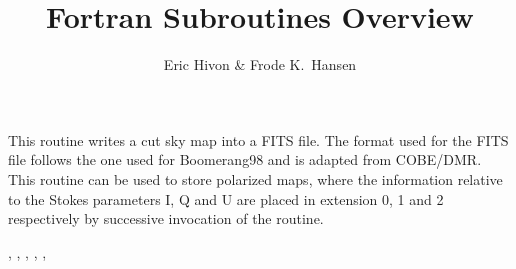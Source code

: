 
\sloppy


\title{\healpix Fortran Subroutines Overview}
 \section[write\_fits\_cut4]{ }
\label{sub:write_fits_cut4}
\author{Eric Hivon \& Frode K.~Hansen}

\begin{facility}
{This routine writes a cut sky \healpix map into a FITS file. The format used for the
FITS file follows the one used for Boomerang98 and is adapted from COBE/DMR. 
This routine can be used to store polarized maps, where the
information relative to the Stokes parameters I, Q and U are placed in extension
0, 1 and 2 respectively by successive invocation of the routine.}
{\modFitstools}
\end{facility}

\begin{f90format}
{%
, %
, %
, %
, %
, %
 }
\end{f90format}
\aboutoptional

